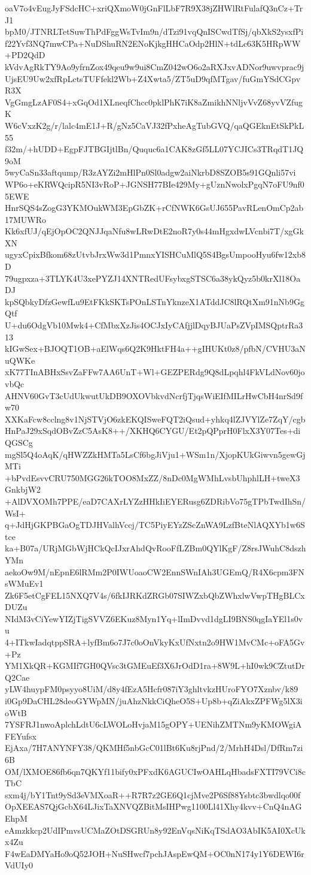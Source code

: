 oaV7o4vEugJyFSdcHC+xriQXmoW0jGnFlLbF7R9X38jZHWlRtFulafQ3nCz+TrJ1
bpM0/JTNRLTetSuwThPdFggWsTvIm9n/dTzi91vqQnISCwdTfSj/qbXkS2ysxfPi
f22Yvf3NQ7mwCPa+NuDShuRN2ENoKjkgHHCaOdp2HlN+tdLc63K5HRpWW+PD2QdD
kVdvAgRkTY9Ao9yfrnZox49qeu9w9ui8CmZ042wO6o2aRXJxvADNor9uwvprac9j
UjsEU9Uw2xfRpLctsTUFfekl2Wb+Z4Xwta5/ZT5uD9qfMTgav/fuGmYSdCGpvR3X
VgGmgLzAF0S4+xGqOd1XLneqfChcc0pklPhK7iK8aZmikhNNljvVvZ68yvVZfugK
W6cVxzK2g/r/lalc4mE1J+R/gNz5CaVJ32fPxheAgTubGVQ/qaQGEknEtSkPkL55
f32m/+hUDD+EgpFJTBGIjtlBn/Ququc6a1CAK8zGf5LL07YCJICs3TRqdT1JQ9oM
5wyCaSn33aftqump/R3zAYZi2mHlPn0Sl0adgw2aiNkrbD8SZOB5s91GQnli57vi
WP6o+eKRWQcipR5NI3vRoP+JGNSH77BIe429My+gUznNwolxPgqN7oFU9nf05EWE
HnrSQS4sZogG3YKMOukWM3EpGbZK+rCfNWK6GsUJ655PavRLenOmCp2ab17MUWRo
Kk6xfUJ/qEjOpOC2QNJJqaNfu8wLRwDtE2noR7y0s44mHgxdwLVcnbi7T/xgGkXN
ugyxCpixBfkom68zUtvbJrxWw3d1PmnxYISHCuMlQ5S4BgsUmpooHyu6fw12xb8D
79ugpxza+3TLYK4U3xePYZJ14XNTRedUFsybxgSTSC6a38ykQyz5b0krXl18OaDJ
kpSQbkyDfzGewfLu9EtFKkSKTsPOnLSTnYknzeX1ATddJC8lRQtXm91nNb9GgQtf
U+du6OdgVb10Mwk4+CfMbxXzJis4OCJxIyCAfjjlDqyBJUaPsZVpIMSQptrRa313
kIGwSex+BJOQT1OB+aElWqs6Q2K9HktFH4a++gIHUKt0z8/pfbN/CVHU3aNuQWKe
xK77TInABHxSsvZaFFw7AA6UnT+Wl+GEZPERdg9Q8dLpqhl4FkVLdNov60jovbQc
AHNV60GvT3cUdUkwutUkDB9OXOVbkvdNcrfjTjqsWiEIfMILrHwCbH4nrSd9fw70
XXKaFcw8cclng8v1NjSTVjO6zkEKQISweFQT2iQsud+yhkq4lZJVYlZe7ZqY/cgb
HnPaJ29xSqdOBvZzC5AsK8++/XKHQ6CYGU/Et2pQPprH0FlxX3Y07Tes+diQGSCg
mgSl5Q4oAqK/qHWZZkHMTa5LsCf6bgJiVju1+WSm1n/XjopKUkGiwvn5gewGjMTi
+bPvdEsvvCRU750MGG26kTOO8MxZZ/8nDc0MgWMhLvsbUhphlLH+tweX3GnkbjW2
+AlDVXOMh7PPE/eaD7CAXrLYZzHHkIiEYERusg6ZDRibVo75gTPbTwdIhSn/WsI+
q+JdHjGKPBGaOgTDJHValhVccj/TC5PiyEYzZScZnWA9LzfBteNlAQXYb1w6Stce
ka+B07a/URjMGbWjHCkQcIJxrAhdQvRooFfLZBm0QYlKgF/Z8rsJWuhC8dszhYMn
aekoOw9M/nEpnE6lRMm2P0IWUoaoCW2EnnSWnIAh3UGEmQ/R4X6cpm3FNsWMuEv1
Zk6F5etCgFEL15NXQ7V4s/6fkIJRKdZRGb07SIWZxbQbZWhxlwVwpTHgBLCxDUZu
NIdM3vCiYewYIZjTigSVVZ6EKuz8Myn1Yq+lImDvvd1dgLI9BNS0qgIaYEl1s0vu
4+ITkwIadqtppSRA+lyfBm6o7J7c0oOnVkyKxUfNxtn2o9HW1MvCMc+oFA5Gv+Pz
YM1XkQR+KGMIf7GH0QVsc3tGMEuEf3X6JrOdD1ra+8W9L+hI0wk9CZtutDrQ2Cae
yLW4huypFM0psyyo8UiM/d8y4fEzA5Hcfr087iY3ghltvkzHUroFYO7Xznbv/k89
i0Gp9DaCHL28deoGYWpMN/juAhzNkkCiQheO5S+Up8b+qZiAkxZPFWg5lX3ioWtB
7YSFRJ1nwoAplchLdtU6cLWOLoHvjaM15gOPY+UENihZMTNm9yKMOWgiAFEYufsx
EjAxa/7H7ANYNFY38/QKMHf5nbGcC01lBt6Ku8rjPnd/2/MrhH4Dsl/DfRm7zi6B
OM/lXMOE86fb6qn7QKYf11bify0xPFxdK6AGUCIwOAHLqHbadsFXTI79VCi8cTbC
sxm4j/bY1Tnt9ySd3eVMXoaR++R7R7z2GE6Q1cjMve2P6Sf88Ysbtc3bwdlqo00f
OpXEEAS7QjGcbX64LJixTaXNVQZBitMsIHPwg1100Ll41Xhy4kvv+CnQ4nAGEhpM
eAmzkkcp2UdIPmvsUCMaZOtDSGRUn8y92EnVqsNiKqTSdAO3AbIK5AI0XcUkx4Zu
F4wEaDMYaHo9oQ52JOH+NuSHwcf7pchJAspEwQM+OC0nN174y1Y6DEWI6rVdUIy0

